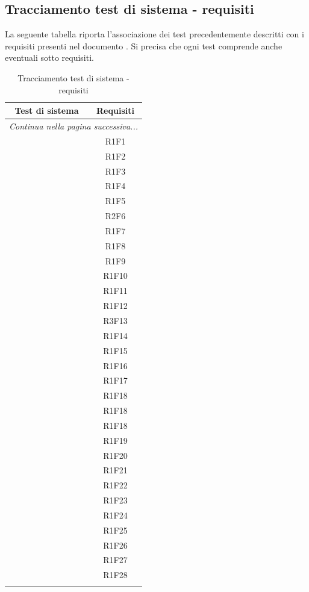 \subsection{Tracciamento test di sistema - requisiti}
La seguente tabella riporta l'associazione dei test precedentemente descritti con i requisiti presenti nel documento . Si precisa che ogni test comprende anche eventuali sotto requisiti.
\resetCTS
\begin{center}
	\begin{longtable}{|c|c|}
		\hline
		\rowcolor{lighter-grayer}
		\textbf{Test di sistema} & \textbf{Requisiti} \\
		\hline
		\endfirsthead
		\hline
		\multicolumn{2}{|c|}{\textit{Continua nella pagina successiva...}} \\
		\hline
		\endfoot
		\endlastfoot

		\hline
		 & R1F1 \\
		 & R1F2 \\
		 & R1F3 \\
		 & R1F4 \\
		 & R1F5 \\
		 & R2F6 \\
		 & R1F7 \\
		 & R1F8 \\
		 & R1F9 \\
		 & R1F10 \\

		 & R1F11  \\
		 & R1F12 \\
		 & R3F13 \\
		 & R1F14 \\
		 & R1F15 \\
		 & R1F16 \\
		 & R1F17 \\
		 & R1F18 \\
		 & R1F18 \\
		 & R1F18 \\

		 & R1F19 \\
		 & R1F20 \\
		 & R1F21 \\
		 & R1F22 \\
		 & R1F23 \\
		 & R1F24 \\
		 & R1F25 \\
		 & R1F26 \\
		 & R1F27 \\
		 & R1F28 \\
		
		\hline
		\caption{Tracciamento test di sistema - requisiti}
	\end{longtable}
\end{center}



